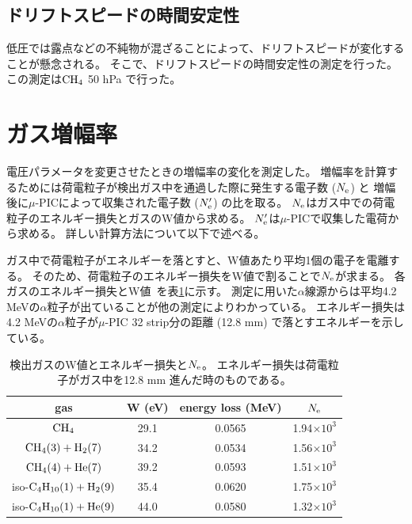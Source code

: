 \subsection{ドリフトスピードの時間安定性}
低圧では露点などの不純物が混ざることによって、ドリフトスピードが変化することが懸念される。
そこで、ドリフトスピードの時間安定性の測定を行った。
この測定は$\rm CH_{4}$ 50 hPa で行った。

\section{ガス増幅率}
電圧パラメータを変更させたときの増幅率の変化を測定した。
増幅率を計算するためには荷電粒子が検出ガス中を通過した際に発生する電子数 ($N_{\rm e}$) と
増幅後に$\mu$-PICによって収集された電子数 ($N'_{\rm e}$) の比を取る。
$N_{\rm e}$はガス中での荷電粒子のエネルギー損失とガスのW値から求める。
$N'_{\rm e}$は$\mu$-PICで収集した電荷から求める。
詳しい計算方法について以下で述べる。

ガス中で荷電粒子がエネルギーを落とすと、W値あたり平均1個の電子を電離する。
そのため、荷電粒子のエネルギー損失をW値で割ることで$N_{\rm e}$が求まる。
各ガスのエネルギー損失とW値~\cite{energy_per_ion_pair,pdg}を表\ref{tab::energy_loss_and_W_val}に示す。
測定に用いた$\alpha$線源からは平均4.2 MeVの$\alpha$粒子が出ていることが他の測定によりわかっている。
エネルギー損失は4.2 MeVの$\alpha$粒子が$\mu$-PIC 32 strip分の距離 (12.8 mm) で落とすエネルギーを示している。
\begin{table}
  \centering
  \caption[検出ガスのW値とエネルギー損失と$N_{\rm e}$。]
          {検出ガスのW値とエネルギー損失と$N_{\rm e}$。
          エネルギー損失は荷電粒子がガス中を12.8 mm 進んだ時のものである。}
  \label{tab::energy_loss_and_W_val}
  \begin{tabular}{cccc}
    \toprule
    gas & W (eV) & energy loss (MeV) & $N_{\rm e}$\\
    \midrule
    ${\rm CH_{4}}$                          & 29.1 & 0.0565 & 1.94$\times 10^{3}$ \\
    ${\rm CH_{4} (3) + H_{2} (7)}$          & 34.2 & 0.0534 & 1.56$\times 10^{3}$ \\
    ${\rm CH_{4} (4) + He (7)}$             & 39.2 & 0.0593 & 1.51$\times 10^{3}$ \\
    iso-${\rm C_{4}H_{10} (1) + H_{2} (9)}$ & 35.4 & 0.0620 & 1.75$\times 10^{3}$ \\
    iso-${\rm C_{4}H_{10} (1) + He (9)}$    & 44.0 & 0.0580 & 1.32$\times 10^{3}$ \\
    \bottomrule
  \end{tabular}
\end{table}

